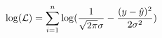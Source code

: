 \documentclass[preview]{standalone}
\begin{document}
\begin{align*}
\special{dvisvgm:raw <g id='unique000'>}\log(\mathcal{L})=\sum^n_{i=1}\log(\frac{1}{\sqrt{2\pi}\sigma}-\frac{(y-\hat{y})^2}{2\sigma^2})\special{dvisvgm:raw </g>}
\end{align*}
\end{document}
